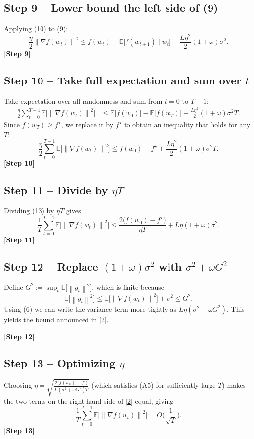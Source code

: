 \documentclass{article}
\newcommand{\E}{\mathbb{E}}
\newcommand{\norm}[1]{\left\lVert #1\right\rVert}
\newcommand{\grad}{\nabla}
\begin{document}
\subsection*{Step 9 – Lower bound the left side of (9)}
Applying (10) to (9):
\[
\frac{\eta}{2}\norm{\grad f(w_t)}^2
\le f(w_t)-\E\!\big[f(w_{t+1})\mid w_t\big]
   +\frac{L\eta^2}{2}(1+\omega)\sigma^2 .
\tag{11}
\]
\textbf{[Step 9]}

\subsection*{Step 10 – Take full expectation and sum over $t$}
Take expectation over all randomness and sum from $t=0$ to $T-1$:
\begin{align}
\frac{\eta}{2}\sum_{t=0}^{T-1}\E\!\big[\norm{\grad f(w_t)}^2\big]
&\le \E\!\big[f(w_0)\big]-\E\!\big[f(w_T)\big]
   +\frac{L\eta^2}{2}(1+\omega)\sigma^2 T .
\tag{12}
\end{align}
Since $f(w_T)\ge f^{\star}$, we replace it by $f^{\star}$ to obtain an inequality that holds for any $T$:
\[
\frac{\eta}{2}\sum_{t=0}^{T-1}\E\!\big[\norm{\grad f(w_t)}^2\big]
\le f(w_0)-f^{\star}
   +\frac{L\eta^2}{2}(1+\omega)\sigma^2 T .
\tag{13}
\]
\textbf{[Step 10]}

\subsection*{Step 11 – Divide by $\eta T$}
Dividing (13) by $\eta T$ gives
\[
\frac{1}{T}\sum_{t=0}^{T-1}\E\!\big[\norm{\grad f(w_t)}^2\big]
\le \frac{2\big(f(w_0)-f^{\star}\big)}{\eta T}
   +L\eta(1+\omega)\sigma^2 .
\tag{14}
\]
\textbf{[Step 11]}

\subsection*{Step 12 – Replace $(1+\omega)\sigma^2$ with $\sigma^2+\omega G^2$}
Define $G^2:=\sup_{t}\E\!\big[\norm{g_t}^2\big]$, which is finite because
\[
\E\!\big[\norm{g_t}^2\big]\le \E\!\big[\norm{\grad f(w_t)}^2\big]+\sigma^2\le G^2 .
\]
Using (6) we can write the variance term more tightly as $L\eta(\sigma^2+\omega G^2)$. This yields the bound announced in \eqref{2}.

\textbf{[Step 12]}

\subsection*{Step 13 – Optimizing $\eta$}
Choosing $\eta = \sqrt{\frac{2\big(f(w_0)-f^{\star}\big)}{L(\sigma^2+\omega G^2)T}}$ (which satisfies (A5) for sufficiently large $T$) makes the two terms on the right‑hand side of \eqref{2} equal, giving
\[
\frac{1}{T}\sum_{t=0}^{T-1}\E\!\big[\norm{\grad f(w_t)}^2\big]
= O\!\Big(\frac{1}{\sqrt{T}}\Big).
\]
\textbf{[Step 13]}
\end{document}
